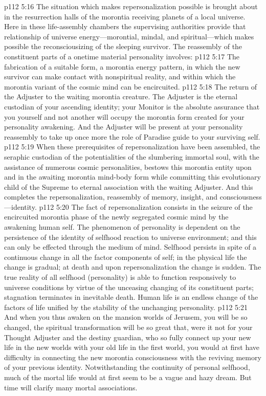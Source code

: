 \pc \vs p112 5:16 The situation which makes repersonalization possible is brought about in the resurrection halls of the morontia receiving planets of a local universe. Here in these life\hyp{}assembly chambers the supervising authorities provide that relationship of universe energy---morontial, mindal, and spiritual---which makes possible the reconsciousizing of the sleeping survivor. The reassembly of the constituent parts of a onetime material personality involves:
\pc \vs p112 5:17 \bibnobreakspace The fabrication of a suitable form, a morontia energy pattern, in which the new survivor can make contact with nonspiritual reality, and within which the morontia variant of the cosmic mind can be encircuited.
\pc \vs p112 5:18 \bibnobreakspace The return of the Adjuster to the waiting morontia creature. The Adjuster is the eternal custodian of your ascending identity; your Monitor is the absolute assurance that you yourself and not another will occupy the morontia form created for your personality awakening. And the Adjuster will be present at your personality reassembly to take up once more the role of Paradise guide to your surviving self.
\pc \vs p112 5:19 \bibnobreakspace When these prerequisites of repersonalization have been assembled, the seraphic custodian of the potentialities of the slumbering immortal soul, with the assistance of numerous cosmic personalities, bestows this morontia entity upon and in the awaiting morontia mind\hyp{}body form while committing this evolutionary child of the Supreme to eternal association with the waiting Adjuster. And this completes the repersonalization, reassembly of memory, insight, and consciousness---identity.
\pc \vs p112 5:20 The fact of repersonalization consists in the seizure of the encircuited morontia phase of the newly segregated cosmic mind by the awakening human self. The phenomenon of personality is dependent on the persistence of the identity of selfhood reaction to universe environment; and this can only be effected through the medium of mind. Selfhood persists in spite of a continuous change in all the factor components of self; in the physical life the change is gradual; at death and upon repersonalization the change is sudden. The true reality of all selfhood (personality) is able to function responsively to universe conditions by virtue of the unceasing changing of its constituent parts; stagnation terminates in inevitable death. Human life is an endless change of the factors of life unified by the stability of the unchanging personality.
\vs p112 5:21 And when you thus awaken on the mansion worlds of Jerusem, you will be so changed, the spiritual transformation will be so great that, were it not for your Thought Adjuster and the destiny guardian, who so fully connect up your new life in the new worlds with your old life in the first world, you would at first have difficulty in connecting the new morontia consciousness with the reviving memory of your previous identity. Notwithstanding the continuity of personal selfhood, much of the mortal life would at first seem to be a vague and hazy dream. But time will clarify many mortal associations.
